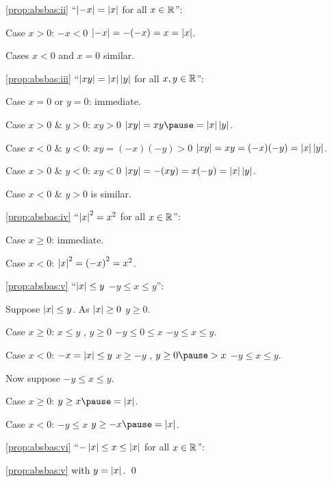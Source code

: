 \documentclass[10pt,aspectratio=149]{beamer}
\begin{document}
\begin{frame}

\eqref{prop:absbas:ii} ``$\left\lvert {-x} \right\rvert = \left\lvert {x} \right\rvert$ for all $x \in {\mathbb{R}}$'':

\pause
Case $x > 0$: \pause \quad $-x < 0$ \pause \wthus $\left\lvert {-x} \right\rvert = -(-x) = x = \left\lvert {x} \right\rvert$.

\pause
Cases $x < 0$ and $x=0$ similar.

\medskip
\pause

\eqref{prop:absbas:iii} ``$\left\lvert {xy} \right\rvert = \left\lvert {x} \right\rvert\left\lvert {y} \right\rvert$ for all $x,y \in {\mathbb{R}}$'':

\pause
Case $x=0$ or $y=0$: immediate.

\pause
Case $x > 0$ \& $y > 0$: \pause
\quad $xy > 0$ \pause \wthus
$\abs{xy} = xy \pause = \abs{x} \abs{y}$.

\pause
Case $x < 0$ \& $y < 0$: \pause
\quad $xy = (-x)(-y) > 0$ \pause
\wthus
$\left\lvert {xy} \right\rvert = xy = (-x)(-y) = \left\lvert {x} \right\rvert \left\lvert {y} \right\rvert$.

\pause
Case $x > 0$ \& $y < 0$: \pause
\quad
$xy < 0$
\pause
\wthus
$\left\lvert {xy} \right\rvert = -(xy) = x(-y) = \left\lvert {x} \right\rvert\left\lvert {y} \right\rvert$.

\pause
Case $x < 0$ \& $y > 0$ is similar.

\medskip
\pause

\eqref{prop:absbas:iv} ``$\left\lvert {x} \right\rvert^2 = x^2$ for all $x \in {\mathbb{R}}$'':

\pause
Case $x \geq 0$: immediate.

\pause
Case $x < 0$: \pause \quad $\left\lvert {x} \right\rvert^2 = {(-x)}^2 = x^2$.

\end{frame}

\begin{frame}

\eqref{prop:absbas:v} ``$\left\lvert {x} \right\rvert \leq y$ \wiffif $-y \leq x \leq y$'':

\medskip
\pause

Suppose $\left\lvert {x} \right\rvert \leq y$.  As $\lvert {x} \rvert \geq 0$ \wthus $y \geq 0$.

\pause
Case $x \geq 0$:
\pause \quad $x \leq y$ \pause \quad , \quad $y \geq 0$ \pause \wthus $-y
\leq 0 \leq x$ \pause \wthus $-y \leq x \leq y$.

\pause
Case $x < 0$: \pause \quad $-x = \left\lvert {x} \right\rvert \leq y$ \pause \wthus
$x \geq -y$ \pause \quad , \quad $y \geq 0 \pause > x$ \wthus
$-y \leq x \leq y$.

\medskip
\pause

Now suppose
$-y \leq x \leq y$.

\pause
Case $x \geq 0$: \pause \quad $y \geq x \pause = \abs{x}$.

\pause
Case $x < 0$: \pause \quad $-y \leq x$ \pause \wthus
$y \geq -x \pause = \abs{x}$.

\medskip
\pause

\eqref{prop:absbas:vi} ``$-\left\lvert {x} \right\rvert \leq x \leq \left\lvert {x} \right\rvert$ for all $x \in {\mathbb{R}}$'':

\pause
\eqref{prop:absbas:v} with $y = \left\lvert {x} \right\rvert$.
\qed
\end{frame}
\end{document}
